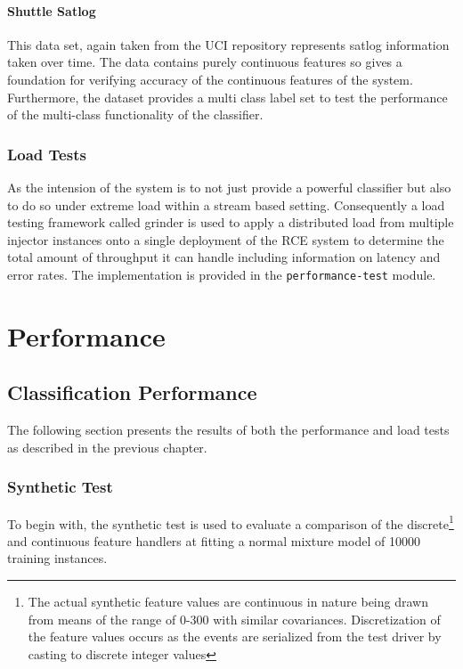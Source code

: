 \documentclass[a4paper,11pt]{scrreprt}
\begin{document}
\subsubsection{Shuttle Satlog}
This data set, again taken from the UCI repository represents satlog information taken over time. The data contains purely continuous features so gives a foundation for verifying accuracy of the continuous features of the system. Furthermore, the dataset provides a multi class label set to test the performance of the multi-class functionality of the classifier.

\subsection{Load Tests}
As the intension of the system is to not just provide a powerful classifier but also to do so under extreme load within a stream based setting. Consequently a load testing framework called grinder\cite{grinder} is used to apply a distributed load from multiple injector instances onto a single deployment of the RCE system to determine the total amount of throughput it can handle including information on latency and error rates. The implementation is provided in the \verb|performance-test| module.

\chapter{Performance}
\section{Classification Performance}
The following section presents the results of both the performance and load tests as described in the previous chapter.
\subsection{Synthetic Test}
To begin with, the synthetic test is used to evaluate a comparison of the discrete\footnote{The actual synthetic feature values are continuous in nature being drawn from means of the range of 0-300 with similar covariances. Discretization of the feature values occurs as the events are serialized from the test driver by casting to discrete integer values } and continuous feature handlers at fitting a normal mixture model of 10000 training instances.
\end{document}
